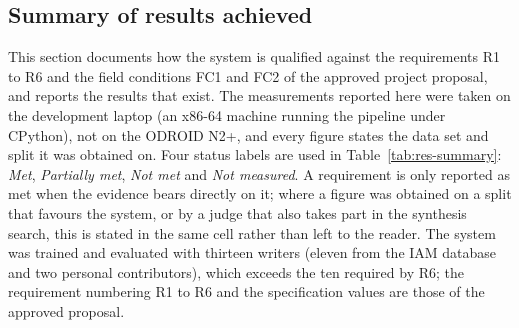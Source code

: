 \label{sec:results}
\providecommand{\nym}{\textbf{[NOT YET MEASURED]}}
\providecommand{\xh}{x_{\mathrm{h}}}
\providecommand{\NoHumanPanel}{%
\textbf{Not carried out.} The blind human panel of eight raters, the Fleiss kappa
agreement measure and the live demonstration of the proposal were not executed,
so the third and fourth sub-tests of this qualification test remain
\nym{}. The feature-correlation and overlay sub-tests above do not replace them:
they establish that the synthesis differs measurably from the writers' real
hands, but they cannot say whether a person would accept the output as being in
that writer's style, which is what the proposal's demonstration asks.}

\subsection{Summary of results achieved} %
\label{sec:res-summary}

This section documents how the system is qualified against the requirements R1 to R6 and the field conditions FC1 and FC2 of the approved project proposal, and reports the results that exist.
The measurements reported here were taken on the development laptop (an x86-64 machine running the pipeline under CPython), not on the ODROID N2+, and every figure states the data set and split it was obtained on.
Four status labels are used in Table~\ref{tab:res-summary}: \emph{Met}, \emph{Partially met}, \emph{Not met} and \emph{Not measured}.
A requirement is only reported as met when the evidence bears directly on it; where a figure was obtained on a split that favours the system, or by a judge that also takes part in the synthesis search, this is stated in the same cell rather than left to the reader.
The system was trained and evaluated with thirteen writers (eleven from the IAM database and two personal contributors), which exceeds the ten required by R6; the requirement numbering R1 to R6 and the specification values are those of the approved proposal.

